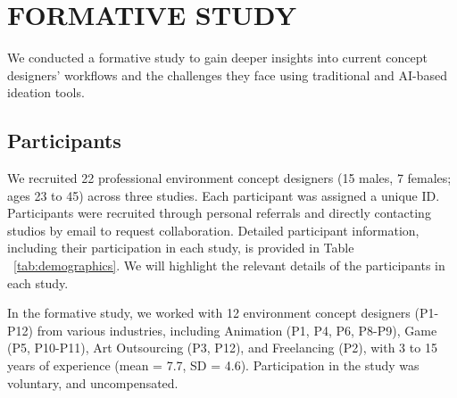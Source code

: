 
\section{FORMATIVE STUDY}
We conducted a formative study to gain deeper insights into current concept designers' workflows and the challenges they face using traditional and AI-based ideation tools.
\subsection{Participants}
We recruited 22 professional environment concept designers (15 males, 7 females; ages 23 to 45) across three studies. Each participant was assigned a unique ID. Participants were recruited through personal referrals and directly contacting studios by email to request collaboration. Detailed participant information, including their participation in each study, is provided in Table ~\ref{tab:demographics}. We will highlight the relevant details of the participants in each study.

In the formative study, we worked with 12 environment concept designers (P1-P12) from various industries, including Animation (P1, P4, P6, P8-P9), Game (P5, P10-P11), Art Outsourcing (P3, P12), and Freelancing (P2), with 3 to 15 years of experience (mean = 7.7, SD = 4.6). Participation in the study was voluntary, and uncompensated.

